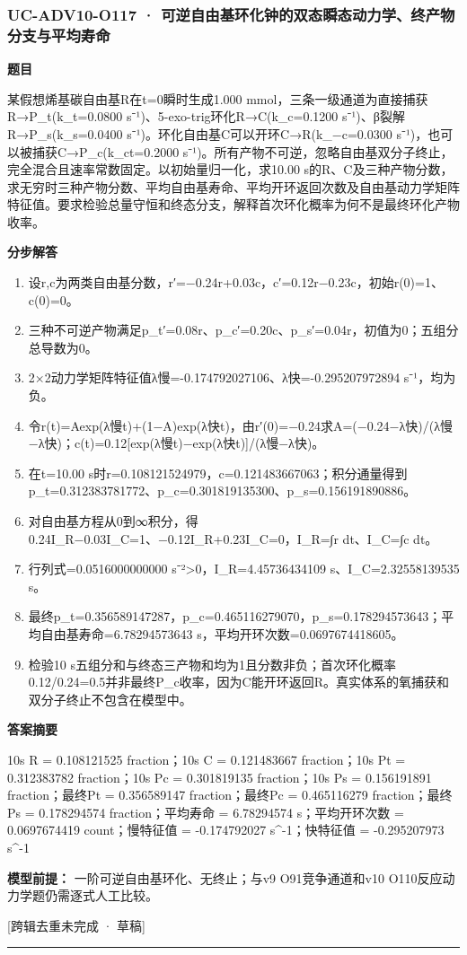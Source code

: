 \documentclass[UTF8,11pt,a4paper]{ctexart}
\begin{document}
\subsubsection*{UC-ADV10-O117 · 可逆自由基环化钟的双态瞬态动力学、终产物分支与平均寿命}
\noindent\textbf{题目}\par
某假想烯基碳自由基R在t=0瞬时生成1.000 mmol，三条一级通道为直接捕获R→P\_t(k\_t=0.0800 s⁻¹)、5-exo-trig环化R→C(k\_c=0.1200 s⁻¹)、β裂解R→P\_s(k\_s=0.0400 s⁻¹)。环化自由基C可以开环C→R(k\_−c=0.0300 s⁻¹)，也可以被捕获C→P\_c(k\_ct=0.2000 s⁻¹)。所有产物不可逆，忽略自由基双分子终止，完全混合且速率常数固定。以初始量归一化，求10.00 s的R、C及三种产物分数，求无穷时三种产物分数、平均自由基寿命、平均开环返回次数及自由基动力学矩阵特征值。要求检验总量守恒和终态分支，解释首次环化概率为何不是最终环化产物收率。\par
\medskip\noindent\textbf{分步解答}
\begin{enumerate}
\item 设r,c为两类自由基分数，r′=−0.24r+0.03c，c′=0.12r−0.23c，初始r(0)=1、c(0)=0。
\item 三种不可逆产物满足p\_t′=0.08r、p\_c′=0.20c、p\_s′=0.04r，初值为0；五组分总导数为0。
\item 2×2动力学矩阵特征值λ慢=-0.174792027106、λ快=-0.295207972894 s⁻¹，均为负。
\item 令r(t)=Aexp(λ慢t)+(1−A)exp(λ快t)，由r′(0)=−0.24求A=(−0.24−λ快)/(λ慢−λ快)；c(t)=0.12[exp(λ慢t)−exp(λ快t)]/(λ慢−λ快)。
\item 在t=10.00 s时r=0.108121524979，c=0.121483667063；积分通量得到p\_t=0.312383781772、p\_c=0.301819135300、p\_s=0.156191890886。
\item 对自由基方程从0到∞积分，得0.24I\_R−0.03I\_C=1、−0.12I\_R+0.23I\_C=0，I\_R=∫r dt、I\_C=∫c dt。
\item 行列式=0.0516000000000 s⁻²>0，I\_R=4.45736434109 s、I\_C=2.32558139535 s。
\item 最终p\_t=0.356589147287，p\_c=0.465116279070，p\_s=0.178294573643；平均自由基寿命=6.78294573643 s，平均开环次数=0.0697674418605。
\item 检验10 s五组分和与终态三产物和均为1且分数非负；首次环化概率0.12/0.24=0.5并非最终P\_c收率，因为C能开环返回R。真实体系的氧捕获和双分子终止不包含在模型中。
\end{enumerate}
\noindent\textbf{答案摘要}\par
10s R = 0.108121525 fraction；10s C = 0.121483667 fraction；10s Pt = 0.312383782 fraction；10s Pc = 0.301819135 fraction；10s Ps = 0.156191891 fraction；最终Pt = 0.356589147 fraction；最终Pc = 0.465116279 fraction；最终Ps = 0.178294574 fraction；平均寿命 = 6.78294574 s；平均开环次数 = 0.0697674419 count；慢特征值 = -0.174792027 s\textasciicircum{}-1；快特征值 = -0.295207973 s\textasciicircum{}-1\par
\noindent\textbf{模型前提：}
一阶可逆自由基环化、无终止；与v9 O91竞争通道和v10 O110反应动力学题仍需逐式人工比较。\par
\noindent\textcolor{red!65!black}{[跨辑去重未完成 · 草稿]} \par
\medskip\hrule\medskip
{}
\end{document}
